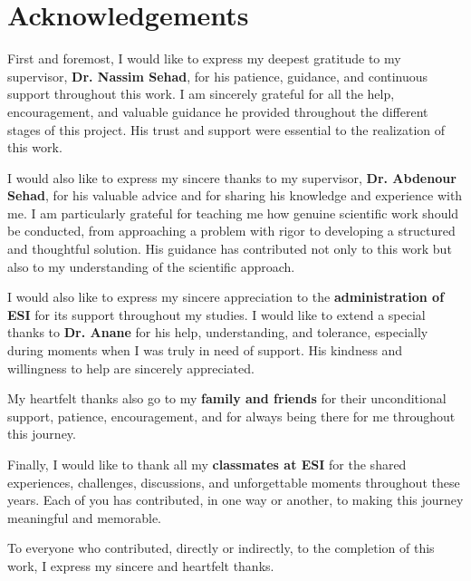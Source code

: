 \chapter*{Acknowledgements}

First and foremost, I would like to express my deepest gratitude to my supervisor,
\textbf{Dr. Nassim Sehad}, for his patience, guidance, and continuous support
throughout this work. I am sincerely grateful for all the help, encouragement, and valuable
guidance he provided throughout the different stages of this project. His trust
and support were essential to the realization of this work.

I would also like to express my sincere thanks to my supervisor,
\textbf{Dr. Abdenour Sehad}, for his valuable advice and for sharing his
knowledge and experience with me. I am particularly grateful for teaching me how
genuine scientific work should be conducted, from approaching a problem with
rigor to developing a structured and thoughtful solution. His guidance has
contributed not only to this work but also to my understanding of the scientific
approach.

I would also like to express my sincere appreciation to the
\textbf{administration of ESI} for its support throughout my studies. I would
like to extend a special thanks to \textbf{Dr. Anane} for his help,
understanding, and tolerance, especially during moments when I was truly in need
of support. His kindness and willingness to help are sincerely appreciated.

My heartfelt thanks also go to my \textbf{family and friends} for their
unconditional support, patience, encouragement, and for always being there for me
throughout this journey.

Finally, I would like to thank all my \textbf{classmates at ESI} for the shared
experiences, challenges, discussions, and unforgettable moments throughout these
years. Each of you has contributed, in one way or another, to making this journey
meaningful and memorable.

To everyone who contributed, directly or indirectly, to the completion of this
work, I express my sincere and heartfelt thanks.
